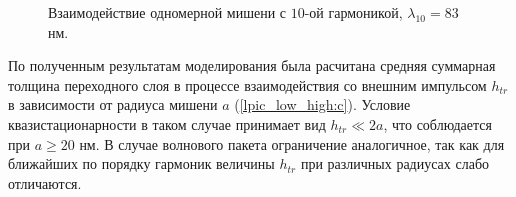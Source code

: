 
    \begin{figure}[htbp]
        \hfil
        \caption{Взаимодействие одномерной мишени с $10$-ой гармоникой, $\lambda_{10} = 83$ нм.}\label{lpic_low_high:image}
    \end{figure}

По полученным результатам моделирования была расчитана средняя суммарная толщина переходного слоя в процессе взаимодействия со внешним импульсом $h_{tr}$ в зависимости от радиуса мишени $a$ (\autoref{lpic_low_high:c}). Условие квазистационарности в таком случае принимает вид $h_{tr} \ll 2a$, что соблюдается при $a \geq 20$ нм. В случае волнового пакета ограничение аналогичное, так как для ближайших по порядку гармоник величины $h_{tr}$ при различных радиусах слабо отличаются.
